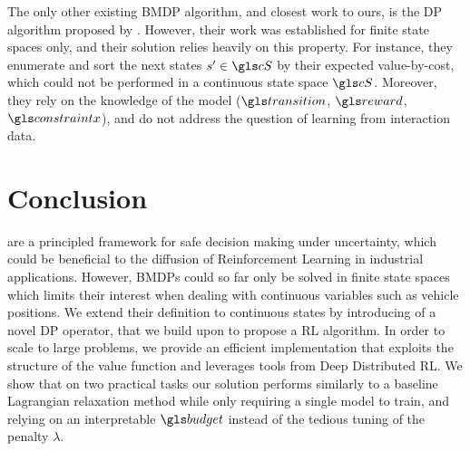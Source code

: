 The only other existing \gls{BMDP} algorithm, and closest work to ours, is the \gls{DP} algorithm proposed by \citet{Boutilier_Lu:uai16}. However, their work was established for finite state spaces only, and their solution relies heavily on this property. For instance, they enumerate and sort the next states $s'\in\cS$ by their expected value-by-cost, which could not be performed in a continuous state space $\cS$. Moreover, they rely on the knowledge of the model ($\Ps$, $\R$, $\constraint$), and do not address the question of learning from interaction data.


\section*{Conclusion}
\label{sec:conclusion}
 are a principled framework for safe decision making under uncertainty, which could be beneficial to the diffusion of Reinforcement Learning in industrial applications. However, \glspl{BMDP} could so far only be solved in finite state spaces which limits their interest when dealing with continuous variables such as vehicle positions. We extend their definition to continuous states by introducing of a novel \acrlong{DP} operator, that we build upon to propose a \acrlong{RL} algorithm. In order to scale to large problems, we provide an efficient implementation that exploits the structure of the value function and leverages tools from Deep Distributed \acrlong{RL}. We show that on two practical tasks our solution performs similarly to a baseline Lagrangian relaxation method while only requiring a single model to train, and relying on an interpretable $\budget$ instead of the tedious tuning of the penalty $\lambda$.




